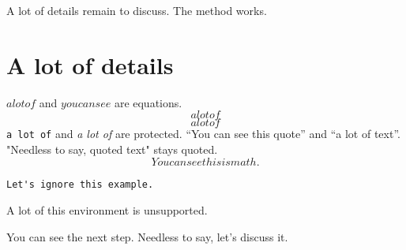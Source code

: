 
A lot of details remain to discuss.
The \cite{a lot of references} method works.
\label{you can see}
\section{A lot of details}
$a lot of$ and \(you can see\) are equations.
\[a lot of\]
$$a lot of$$
\verb|a lot of| and \textit{a lot of} are protected.
``You can see this quote'' and “a lot of text”.
"Needless to say, quoted text" stays quoted.
\begin{equation}
You can see this is math.
\end{equation}
\begin{verbatim}
Let's ignore this example.
\end{verbatim}
\begin{unknown}
A lot of this environment is unsupported.
\end{unknown}
You can see the next step. Needless to say, let's discuss it.

